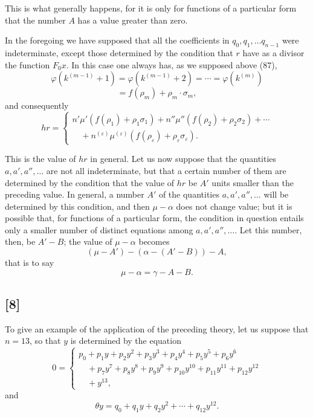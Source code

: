 \documentclass{article}
\begin{document}
This is what generally happens, for it is only for functions of a particular form that the number $A$ has a value greater than zero.

In the foregoing we have supposed that all the coefficients in $q_0, q_1, \ldots q_{n-1}$ were indeterminate, except those determined by the condition that $r$ have as a divisor the function $F_0 x$. In this case one always has, as we supposed above (87),
\[ \varphi(k^{(m-1)}+1) = \varphi(k^{(m-1)}+2) = \cdots = \varphi(k^{(m)}) \]
\[ = f(\rho_m) + \rho_m \cdot \sigma_m, \]
and consequently
\[ hr = \begin{cases} n'\mu'\left(f(\rho_1)+\rho_1\sigma_1\right) + n''\mu''\left(f(\rho_2)+\rho_2\sigma_2\right) + \cdots \\ \quad + n^{(\varepsilon)}\mu^{(\varepsilon)}\left(f(\rho_\varepsilon)+\rho_\varepsilon\sigma_\varepsilon\right). \end{cases} \tag{106} \]

This is the value of $hr$ in general. Let us now suppose that the quantities $a, a', a'', \ldots$ are not all indeterminate, but that a certain number of them are determined by the condition that the value of $hr$ be $A'$ units smaller than the preceding value. In general, a number $A'$ of the quantities $a, a', a'', \ldots$ will be determined by this condition, and then $\mu-\alpha$ does not change value; but it is possible that, for functions of a particular form, the condition in question entails only a smaller number of distinct equations among $a, a', a'', \ldots$. Let this number, then, be $A'-B$; the value of $\mu-\alpha$ becomes
\[ (\mu-A') - (\alpha-(A'-B)) - A, \]
that is to say
\[ \mu - \alpha = \gamma - A - B. \tag{107} \]

\subsection*{[8]}

To give an example of the application of the preceding theory, let us suppose that $n = 13$, so that $y$ is determined by the equation
\[ 0 = \begin{cases} p_0 + p_1 y + p_2 y^{2} + p_3 y^{3} + p_4 y^{4} + p_5 y^{5} + p_6 y^{6} \\ \quad + p_7 y^{7} + p_8 y^{8} + p_9 y^{9} + p_{10} y^{10} + p_{11} y^{11} + p_{12} y^{12} \\ \quad + y^{13}, \end{cases} \]
and
\[ \theta y = q_0 + q_1 y + q_2 y^{2} + \cdots + q_{12} y^{12}. \]
\end{document}
